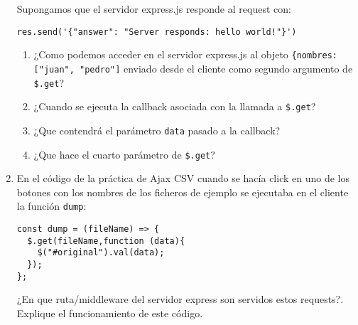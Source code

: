 \documentclass[spanish,a4paper,11pt]{article}
\begin{document}
\begin{enumerate}
Supongamos que el servidor express.js responde al request con:
\begin{verbatim}
res.send('{"answer": "Server responds: hello world!"}')
\end{verbatim}
\begin{enumerate}
\item 
¿Como podemos acceder en el servidor express.js 
al objeto \verb|{nombres: ["juan", "pedro"]| enviado
desde el cliente  como segundo argumento de \verb|$.get|?
\item 
¿Cuando se ejecuta la callback asociada con la llamada a \verb|$.get|? 
\item 
¿Que contendrá el parámetro
\verb|data| pasado a la callback?
\item 
¿Que hace el cuarto parámetro de \verb|$.get|?
\end{enumerate}
\item  En el código de la práctica de Ajax CSV cuando se hacía click en uno de los botones con los nombres 
de los ficheros de ejemplo se ejecutaba en el cliente la función \verb|dump|:
\begin{verbatim}
const dump = (fileName) => {
  $.get(fileName,function (data){
    $("#original").val(data);
  });
};
\end{verbatim}
¿En que ruta/middleware del servidor express son servidos estos requests?.
Explique el funcionamiento de este código.
\end{enumerate}
\end{document}
